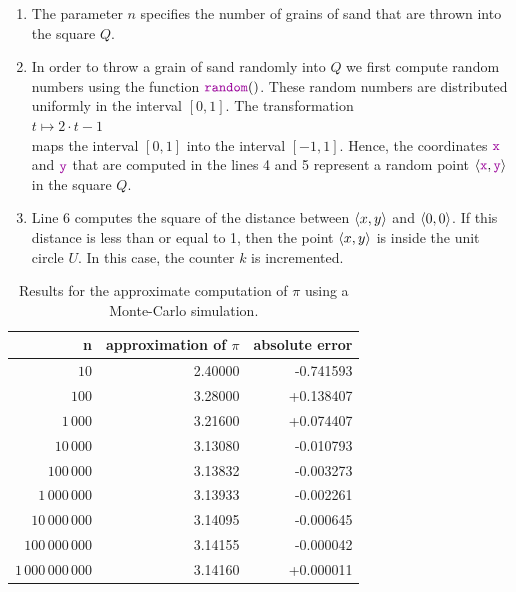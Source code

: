 \begin{enumerate}
\item The parameter $n$ specifies the number of grains of sand that are thrown into the square $Q$.
\item In order to throw a grain of sand randomly into $Q$ we first compute random numbers using the function
      $\mytt{random}()$.  These random numbers are distributed uniformly in the interval  $[0,1]$.   The
      transformation  
      \\[0.2cm]
      \hspace*{1.3cm}
      $t \mapsto 2 \cdot t - 1$
      \\[0.2cm]
      maps the interval $[0,1]$ into the interval $[-1, 1]$.  Hence, the coordinates $\mytt{x}$ and
      $\mytt{y}$ that are computed in the lines 4 and 5 represent a random point $\pair(\mytt{x}, \mytt{y})$ 
      in the square $Q$.
\item Line 6 computes the square of the distance between $\pair(x,y)$ and $\pair(0,0)$.  If this distance is
      less than or equal to 1, then the point $\pair(x,y)$ is inside the unit circle $U$.  In this case, the counter $k$ is incremented.
\end{enumerate}

\begin{table}[htbp]
  \centering
  \begin{tabular}[t]{|r|r|r|}
  \hline
  n & approximation of $\pi$ & absolute error \\
  \hline
  \hline
               $10$ & 2.40000 & -0.741593 \\
\hline
              $100$ & 3.28000 & +0.138407 \\
\hline
           $1\,000$ & 3.21600 & +0.074407 \\
\hline
          $10\,000$ & 3.13080 & -0.010793 \\
\hline
         $100\,000$ & 3.13832 & -0.003273 \\
\hline
      $1\,000\,000$ & 3.13933 & -0.002261 \\
\hline
     $10\,000\,000$ & 3.14095 & -0.000645 \\
\hline
    $100\,000\,000$ & 3.14155 & -0.000042 \\
\hline
 $1\,000\,000\,000$ & 3.14160 & +0.000011 \\
\hline
  \end{tabular}
  \caption{Results for the approximate computation of $\pi$ using a Monte-Carlo simulation.}
  \label{tab:pi}
\end{table}


